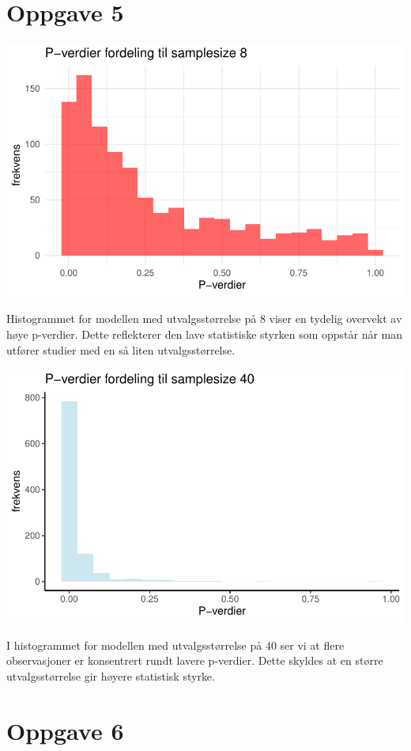 \documentclass[
  letterpaper,
  DIV=11,
  numbers=noendperiod]{scrreprt}
\begin{document}
\section{Oppgave 5}\label{oppgave-5}

\includegraphics{03-statistical-inference_files/figure-pdf/P-verdi histogram SS8-1.pdf}

Histogrammet for modellen med utvalgsstørrelse på 8 viser en tydelig
overvekt av høye p-verdier. Dette reflekterer den lave statistiske
styrken som oppstår når man utfører studier med en så liten
utvalgsstørrelse.

\includegraphics{03-statistical-inference_files/figure-pdf/P-verdi histogram SS40-1.pdf}

I histogrammet for modellen med utvalgsstørrelse på 40 ser vi at flere
observasjoner er konsentrert rundt lavere p-verdier. Dette skyldes at en
større utvalgsstørrelse gir høyere statistisk styrke.

\section{Oppgave 6}\label{oppgave-6}
\end{document}
